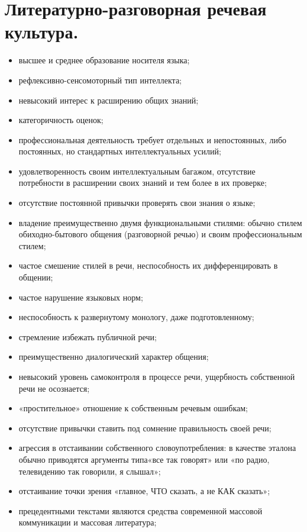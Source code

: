 \section{Литературно-разговорная речевая культура.}

\begin{itemize}
    \item высшее и среднее образование носителя языка;
    \item рефлексивно-сенсомоторный тип интеллекта;
    \item невысокий интерес к расширению общих знаний;
    \item категоричность оценок;
    \item профессиональная деятельность требует отдельных и непостоянных, либо постоянных, но стандартных интеллектуальных усилий;
    \item удовлетворенность своим интеллектуальным багажом, отсутствие потребности в расширении своих знаний и тем более в их проверке;
    \item отсутствие постоянной привычки проверять свои знания о языке;
    \item владение преимущественно двумя функциональными стилями: обычно стилем обиходно-бытового общения (разговорной речью) и своим профессиональным стилем;
    \item частое смешение стилей в речи, неспособность их дифференцировать в общении;
    \item частое нарушение языковых норм;
    \item неспособность к развернутому монологу, даже подготовленному;
    \item стремление избежать публичной речи;
    \item преимущественно диалогический характер общения;
    \item невысокий уровень самоконтроля в процессе речи, ущербность собственной речи не осознается;
    \item «простительное» отношение к собственным речевым ошибкам;
    \item отсутствие привычки ставить под сомнение правильность своей речи;
    \item агрессия в отстаивании собственного словоупотребления: в качестве эталона обычно приводятся аргументы типа«все так говорят» или «по радио, телевидению так говорили, я слышал»;
    \item отстаивание точки зрения «главное, ЧТО сказать, а не КАК сказать»;
    \item прецедентными текстами являются средства современной массовой коммуникации и массовая литература;

\end{itemize}
